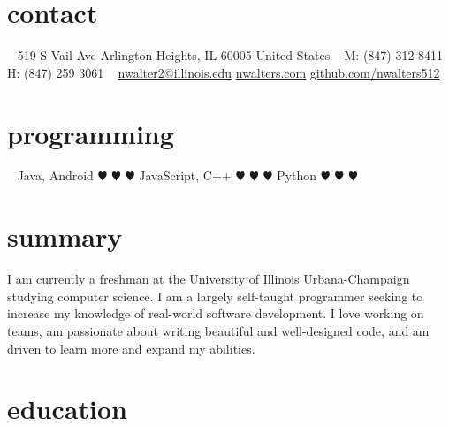 \documentclass[]{resume} %
\begin{document}


\begin{aside} %
\section{contact}
~
519 S Vail Ave
Arlington Heights, IL 60005
United States
~
M: (847) 312 8411
H: (847) 259 3061
~
\href{mailto:nwalter2@illinois.edu}{nwalter2@illinois.edu}
\href{http://www.nwalters.com}{nwalters.com}
\href{http://github.com/nwalters512}{github.com/nwalters512}
\section{programming}
~
Java, Android {\color{red} $\varheartsuit$} {\color{red} $\varheartsuit$} {\color{red} $\varheartsuit$}  
JavaScript, C++ {\color{red} $\varheartsuit$} {\color{red} $\varheartsuit$} {\color{white} $\varheartsuit$} 
Python {\color{red} $\varheartsuit$} {\color{white} $\varheartsuit$} {\color{white} $\varheartsuit$} 
\end{aside}


\section{summary}

I am currently a freshman at the University of Illinois Urbana-Champaign studying computer science. I am a largely self-taught programmer seeking to increase my knowledge of real-world software development. I love working on teams, am passionate about writing beautiful and well-designed code, and am driven to learn more and expand my abilities.


\section{education}
\end{document}

